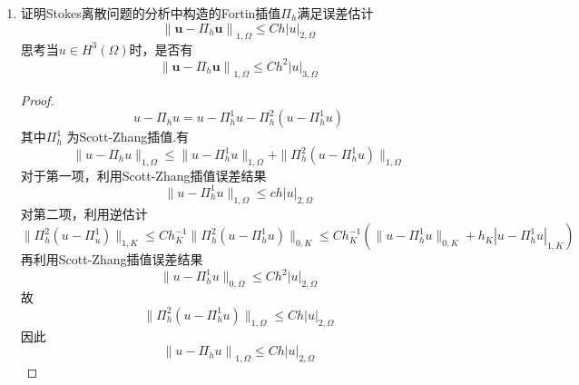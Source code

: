 \documentclass[12pt,a4paper]{article}
\begin{document}
\begin{enumerate}
\begin{enumerate}
			\begin{proof}
				通过尺度变换技巧变换到参考单元：
				$$|\Pi_{h}^2{v}|_{1,K}=|\widehat{\Pi_{h}^2{v}}|_{1,\hat{K}}\leq C||\hat{v}||_{1,\hat{K}}\leq C(h_{K}^{-1}|{v}|_{0,K}+|{v}|_{1,K}).$$
				再利用逆估计得到结果.
			\end{proof}
			
			\item $b(\Pi_h^2\mathbf{v},q_h)=b(\mathbf{v},q_h),\:\forall q_h\in Q_h$
			
			\begin{proof}
				由$\Pi_h^2 v$的定义有
				\begin{equation*}
					\begin{aligned}
						&\int_e (v-\Pi^2_h v) \cdot \nu q_h ds=0,\quad \forall q_h \in Q_h, \quad \forall e \in \partial K \\
						\Rightarrow & \int_{\partial K} (v-\Pi^2_h v) \cdot \nu q_h ds=0 ,\quad \forall q_h \in Q_h\\
						\Rightarrow & \int_K \mathrm{div}(v-\Pi^2_{h}v) q_h dx = 0,\quad \forall q_h \in Q_h, \quad \forall K \subset \Gamma_h \\
						\Rightarrow & \int_{\Omega} \mathrm{div}(v-\Pi^2_{h}v) q_h dx = 0,\quad \forall q_h \in Q_h \\
						\Rightarrow & b(v-\Pi^2_{h}v,q_h) = 0,\quad \forall q_h \in Q_h		
					\end{aligned}
				\end{equation*}
				
			\end{proof}
		\end{enumerate}
	
		\item 证明Stokes离散问题的分析中构造的Fortin插值$\Pi_h$满足误差估计
		$$\left\|\mathbf{u}-\Pi_h\mathbf{u}\right\|_{1,\Omega}\leq Ch\left|u\right|_{2,\Omega}$$
		思考当$u\in H^3(\Omega)$时，是否有
		$$\left\|\mathbf{u}-\Pi_h\mathbf{u}\right\|_{1,\Omega}\leq Ch^2\left|u\right|_{3,\Omega}$$
		
		\begin{proof}
			$$u - \Pi_h u = u- \Pi_h^1 u - \Pi_h^2(u-\Pi_h^1 u)$$
			其中$\Pi_h^1$ 为Scott-Zhang插值.有
			$$\|u-\Pi_h u\|_{1,\Omega}\leq\|u-\Pi_h^1 u\|_{1,\Omega}+\|\Pi_h^2 (u-\Pi_h^1 u)\|_{1,\Omega}$$
			对于第一项，利用Scott-Zhang插值误差结果
			$$\|u-\Pi_h^1 u\|_{1,\Omega} \leq ch|u|_{2,\Omega}$$
			对第二项，利用逆估计
			$$\|\Pi_h^2 (u-\Pi^1_u)\|_{1,K} \leq C h_K^{-1} \|\Pi_h^2(u-\Pi_h^1 u)\|_{0,K} \leq Ch_K^{-1}(\|u-\Pi_h^1 u\|_{0,K}+h_K|u-\Pi_h^1 u|_{1,K}) $$
			再利用Scott-Zhang插值误差结果
			$$\|u-\Pi_h^1 u\|_{0,\Omega}\leq Ch^2|u|_{2,\Omega}$$
			故$$\|\Pi_h^2 (u-\Pi_h^1 u)\|_{1,\Omega}\leq Ch|u|_{2,\Omega}$$
			因此
			$$\left\|u-\Pi_h u\right\|_{1,\Omega}\leq Ch\left|u\right|_{2,\Omega}$$
			

\end{proof}
\end{enumerate}
\end{document}
